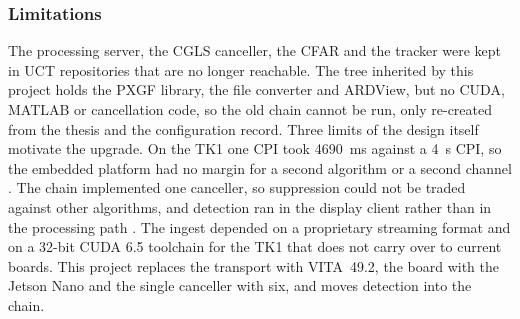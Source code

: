 \subsubsection{Limitations}
\label{subsubsec:ch2.implementations.uct.limitations}
\todo{}
The processing server, the CGLS canceller, the CFAR and the tracker were kept in UCT repositories that are no longer reachable. The tree inherited by this project holds the PXGF library, the file converter and ARDView, but no CUDA, MATLAB or cancellation code, so the old chain cannot be run, only re-created from the thesis and the configuration record. Three limits of the design itself motivate the upgrade. On the TK1 one CPI took 4690~ms against a 4~s CPI, so the embedded platform had no margin for a second algorithm or a second channel \citep{tong2014}. The chain implemented one canceller, so suppression could not be traded against other algorithms, and detection ran in the display client rather than in the processing path \citep{tong2014}. The ingest depended on a proprietary streaming format and on a 32-bit CUDA 6.5 toolchain for the TK1 that does not carry over to current boards. This project replaces the transport with VITA~49.2, the board with the Jetson Nano and the single canceller with six, and moves detection into the chain.

